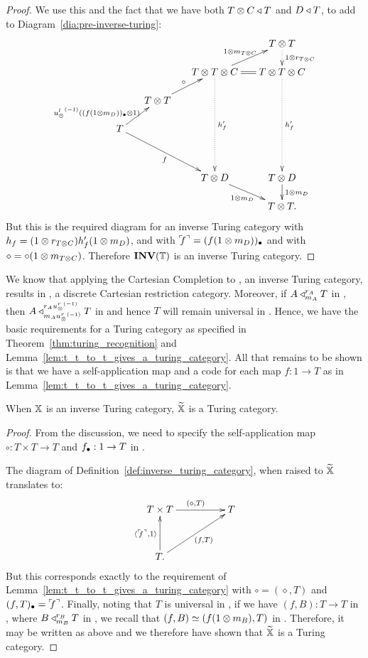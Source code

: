 \begin{proof}
  We use this and the fact that we have both $T\otimes C \triangleleft T$
  and $D \triangleleft T$, to add to   Diagram~\ref{dia:pre-inverse-turing}:
  \[
    \xymatrix @C=15pt @R=15pt{
      & & & T \* T \ar@{.>}[d]^{1\*r_{T\*C}}\\
      & & T \* T \* C \ar@{.>}[dddd]^{h'_f} \ar[ur]^{1\*m_{T\*C}} \ar@{=}[r] &T\*T\*C \ar@{.>}[dddd]^{h'_f} \\
      &T\*T \ar[ur]^{\circ} & & \\
      T \ar[ur]^(.3){\inv{\usl}(\code{(f(1\*m_D))}\*1)} \ar[ddrr]_{f} \\
      & & & \\
      && T\*D \ar[dr]_{1\*m_D} &  T\*D \ar[d]^{1\*m_D}\\
      &&&T\*T.
    }
  \]
  But this is the required diagram for an inverse Turing category with $h_f = (1\otimes r_{T\otimes C}) h'_f (1\otimes m_D)$,
  and with ${}^\ulcorner\!\!f^\urcorner = (f(1\otimes m_D))_{\bullet}$ and  with $\diamond = \circ(1\otimes m_{T\otimes C})$. Therefore
  $\mathbf{INV}({\mathbb{T}})$ is an inverse Turing category.
\end{proof}

We know that applying the Cartesian Completion to \X, an inverse Turing category, results in \Xt, a
discrete Cartesian restriction category. Moreover, if $A\triangleleft_{m_A}^{r_A} T$ in \X, then $A
\triangleleft_{m_A{u_{\otimes}^r}^{(-1)}}^{r_A{u_{\otimes}^r}^{(-1)}} T$ in \Xt and hence $T$ will remain universal in
\Xt. Hence, we have the basic requirements for a Turing category as specified in
Theorem~\ref{thm:turing_recognition} and Lemma~\ref{lem:t_t_to_t_gives_a_turing_category}. All that
remains to be shown is that we have a self-application map and a code for each map $f:1\to T$ as in
Lemma~\ref{lem:t_t_to_t_gives_a_turing_category}.

\begin{theorem}\label{thm:inverse_turing_category_gives_a_turing_category}
  When $\mathbb{X}$ is an inverse Turing category, $\widetilde{\mathbb{X}}$ is a Turing category.
\end{theorem}
\begin{proof}
  From the discussion, we need to specify the self-application map $\circ:T\times T \to T$ and
  $f_{\bullet}:1 \to T$ in \Xt.

  The diagram of Definition~\ref{def:inverse_turing_category}, when raised to $\widetilde{\mathbb{X}}$
  translates to:
  \[
    \xymatrix@C+25pt@R+10pt{
      T \times T \ar[r]^{(\diamond, T)} &T \\
      T. \ar[u]^{\<\iname{f},1\>} \ar[ur]_{(f, T)}
    }
  \]
  But this corresponds exactly to the requirement of
  Lemma~\ref{lem:t_t_to_t_gives_a_turing_category} with $\circ = (\diamond,T)$ and $(f,T)_{\bullet} =
  {}^\ulcorner\!\!f^\urcorner$.  Finally, noting that $T$ is universal in \X, if we have $(f,B):T\to T$ in \Xt,
  where $B\triangleleft_{m_B}^{r_B} T$ in \X, we recall that $(f,B) \overset{\scriptscriptstyle }{\simeq} (f(1\otimes m_B),T)$ in
  \X. Therefore, it may be  written as above and we therefore have shown that $\widetilde{\mathbb{X}}$ is a Turing
  category.
\end{proof}

